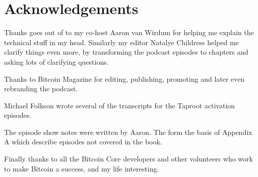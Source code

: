 \chapter{Acknowledgements}

Thanks goes out of to my co-host Aaron van Wirdum for helping me explain the technical stuff in my head. Similarly my editor Natalye Childress helped me clarify things even more, by transforming the podcast episodes to chapters and asking lots of clarifying questions.

Thanks to Bitcoin Magazine for editing, publishing, promoting and later even rebranding the podcast.

Michael Folkson wrote several of the transcripts for the Taproot activation episodes.

The episode show notes were written by Aaron. The form the basis of Appendix A which describe episodes not covered in the book.

Finally thanks to all the Bitcoin Core developers and other volunteers who work to make Bitcoin a success, and my life interesting.

